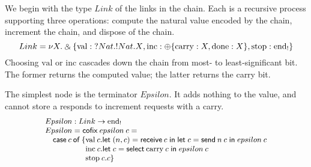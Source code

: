 \documentclass[orivec,envcountsame]{llncs}
\makeatletter
\newcommand{\with}{\mathbin\binampersand}
\newcommand{\gvout}[2]{{!#1.#2}}
\newcommand{\gvin}[2]{{?#1.#2}}
\newcommand{\outterm}{\mathrm{end}_!}
\newcommand{\mkwd}[1]{\mathsf{#1}}
\newcommand{\clabel}[1]{\mathrm{#1}}
\newcommand{\gvsend}[2]{\mkwd{send}\:#1\:#2}
\newcommand{\gvreceive}[1]{\mkwd{receive}\:#1}
\newcommand{\gvlet}[3]{\mkwd{let}\;#1 = #2\;\mkwd{in}\;#3}
\newcommand{\gvselect}[2]{\mkwd{select}\:#1\:#2}
\newcommand{\lrkwd}{\mkwd{cofix}}
\newcommand{\ba}{\begin{array}}
\newcommand{\ea}{\end{array}}
\newcommand{\bl}{\ba[t]{@{}l@{}}}
\newcommand{\el}{\ea}
\makeatother
\begin{document}
We begin with the type $Link$ of the links in the chain. Each is a recursive process supporting
three operations: compute the natural value encoded by the chain, increment the chain, and dispose
of the chain.
%
\[\small
 Link = \nu X. \with \{ \clabel{val}: \gvin{Nat}{\gvout{Nat}{X}},
                        \clabel{inc}: \oplus \{ \clabel{carry}: X,
                                                \clabel{done}: X \},
                        \clabel{stop}: \outterm \}
\]
Choosing $\clabel{val}$ or $\clabel{inc}$ cascades down the chain from most- to least-significant
bit. The former returns the computed value; the latter returns the carry bit.

The simplest node is the terminator $Epsilon$. It adds nothing to the value, and cannot store a
responds to increment requests with a carry.
\[\small
\bl
Epsilon : Link \to \outterm \\
Epsilon = \lrkwd\:epsilon\:c = \\
\quad \mkwd{case}\:c\:\mkwd{of}\:\{
  \bl
  \clabel{val}\:c.
    \bl
    \gvlet{(n,c)}{\gvreceive{c}}{
    \gvlet{c}{\gvsend{n}{c}}{
    epsilon\:c}} \\
    \el \\
  \clabel{inc}\:c.
    \bl
    \gvlet{c}{\gvselect{\clabel{carry}}{c}}{
    epsilon\:c} \\
    \el \\
  \clabel{stop}\:c. c\}  \\
  \el \\
\el
\]
\end{document}

